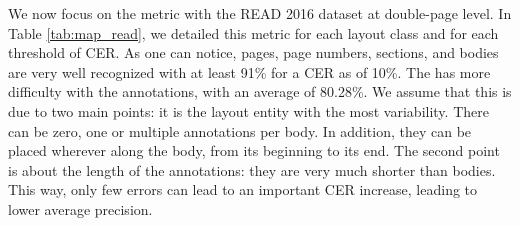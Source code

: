 We now focus on the  metric with the READ 2016 dataset at double-page level. In Table \ref{tab:map_read}, we detailed this metric for each layout class and for each threshold of CER. As one can notice, pages, page numbers, sections, and bodies are very well recognized with at least 91\% for a CER as of 10\%. The \modelacc{} has more difficulty with the annotations, with an average of 80.28\%. We assume that this is due to two main points: it is the layout entity with the most variability. There can be zero, one or multiple annotations per body. In addition, they can be placed wherever along the body, from its beginning to its end. The second point is about the length of the annotations: they are very much shorter than bodies. This way, only few errors can lead to an important CER increase, leading to lower average precision.
\begin{table*}[ht]
    \caption{ detailed for each class and each CER threshold, for the READ 2016 double-page dataset.}
    \centering
    \label{tab:map_read}
\end{table*}

